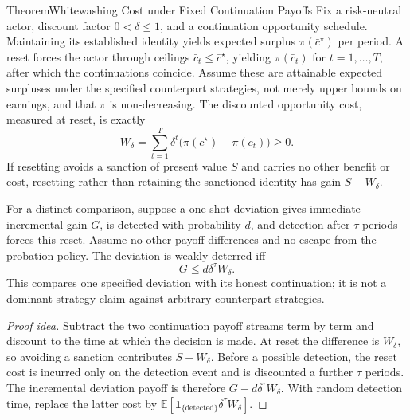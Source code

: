 \documentclass[11pt,a4paper]{article}
\theoremstyle{definition}
\begin{document}
\begin{pdclaim}{Theorem}{Whitewashing Cost under Fixed Continuation Payoffs}
\setlength{\parskip}{4pt plus 1pt}
\label{thm:whitewash-cost}
Fix a risk-neutral actor, discount factor $0<\delta\le1$, and a continuation
opportunity schedule. Maintaining its established identity yields expected
surplus $\pi(\bar{c}^\star)$ per period. A reset forces the actor through
ceilings $\bar{c}_t\le\bar{c}^\star$, yielding $\pi(\bar{c}_t)$ for
$t=1,\ldots,T$, after which the continuations coincide. Assume these are
attainable expected surpluses under the specified counterpart strategies,
not merely upper bounds on earnings, and that $\pi$ is \mbox{non-decreasing}.
The discounted opportunity cost, measured at reset, is exactly
\[
W_\delta=\sum_{t=1}^{T}\delta^t
 \bigl(\pi(\bar{c}^\star)-\pi(\bar{c}_t)\bigr)\ge0.
\]
If resetting avoids a sanction of present value $S$ and carries no other
benefit or cost, resetting rather than retaining the sanctioned identity
has gain $S-W_\delta$.

For a distinct comparison, suppose a one-shot deviation gives immediate
incremental gain $G$, is detected with probability $d$, and detection after
$\tau$ periods forces this reset. Assume no other payoff differences and
no escape from the probation policy. The deviation is weakly deterred iff
\[
 G\le d\delta^\tau W_\delta.
\]
This compares one specified deviation with its honest continuation; it is
not a dominant-strategy claim against arbitrary counterpart strategies.
\end{pdclaim}
\begin{proof}[Proof idea]
Subtract the two continuation payoff streams term by term and discount to
the time at which the decision is made. At reset the difference is
$W_\delta$, so avoiding a sanction contributes $S-W_\delta$. Before a
possible detection, the reset cost is incurred only on the detection event
and is discounted a further $\tau$ periods. The incremental deviation
payoff is therefore $G-d\delta^\tau W_\delta$. With random detection time,
replace the latter cost by
$\mathbb E[\mathbf1_{\{\mathrm{detected}\}}\delta^\tau W_\delta]$.
\end{proof}




\pdmarginpagebreak
\end{document}
